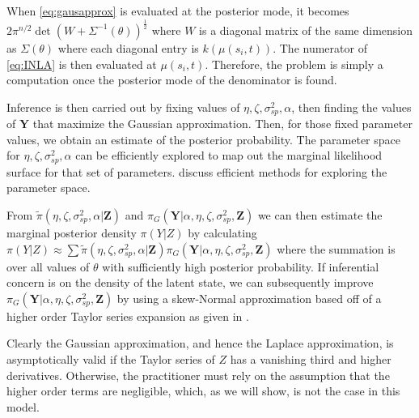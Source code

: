 \documentclass[11pt]{isuthesis}
\begin{document}
	When \eqref{eq:gausapprox} is evaluated at the posterior mode, it becomes $2 \pi^{n/2} \det (W+\Sigma^{-1}(\theta))^{\frac{1}{2}}$ where $W$ is a diagonal matrix of the same dimension as $\Sigma(\theta)$ where each diagonal entry is $k(\mu(s_i,t))$.  The numerator of \eqref{eq:INLA} is then evaluated at $\mu(s_i,t)$.  Therefore, the problem is simply a computation once the posterior mode of the denominator is found.
	
	Inference is then carried out by fixing values of $\eta,\zeta,\sigma_{sp}^2,\alpha$, then finding the values of $\boldsymbol{Y}$ that maximize the Gaussian approximation.  Then, for those fixed parameter values, we obtain an estimate of the posterior probability.  The parameter space for $\eta,\zeta,\sigma_{sp}^2,\alpha$ can be efficiently explored to map out the marginal likelihood surface for that set of parameters.  \cite{rue2009approximate} discuss efficient methods for exploring the parameter space.
	
	From $\tilde{\pi}(\eta,\zeta,\sigma_{sp}^2,\alpha|\boldsymbol{Z})$ and $\pi_G(\boldsymbol{Y}|\alpha,\eta,\zeta,\sigma_{sp}^2,\boldsymbol{Z})$ we can then estimate the marginal posterior density $\pi(Y|Z)$ by calculating $\pi(Y|Z) \approx \sum\tilde{\pi}(\eta,\zeta,\sigma_{sp}^2,\alpha|\boldsymbol{Z})\pi_G(\boldsymbol{Y}|\alpha,\eta,\zeta,\sigma_{sp}^2,\boldsymbol{Z})$ where the summation is over all values of $\theta$ with sufficiently high posterior probability.  If inferential concern is on the density of the latent state, we can subsequently improve $\pi_G(\boldsymbol{Y}|\alpha,\eta,\zeta,\sigma_{sp}^2,\boldsymbol{Z})$ by using a skew-Normal approximation based off of a higher order Taylor series expansion as given in \cite{rue2009approximate}.  
	
	Clearly the Gaussian approximation, and hence the Laplace approximation, is asymptotically valid if the Taylor series of $Z$ has a vanishing third and higher derivatives.  Otherwise, the practitioner must rely on the assumption that the higher order terms are negligible, which, as we will show, is not the case in this model.
	
\end{document}
